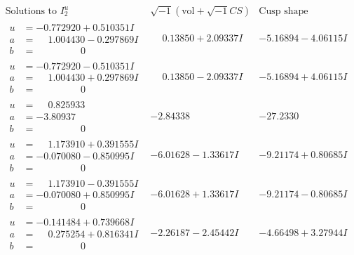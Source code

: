 \documentclass[1p]{elsarticle_modified}
\theoremstyle{definition}
\newcommand{\I}{\sqrt{-1}}
\begin{document}
$$\begin{array}{c|c|c}  
\text{Solutions to }I^u_{2}& \I (\text{vol} + \sqrt{-1}CS) & \text{Cusp shape}\\
 \hline 
\begin{aligned}
u &= -0.772920 + 0.510351 I \\
a &= \phantom{-}1.004430 - 0.297869 I \\
b &= \phantom{-0.000000 } 0\end{aligned}
 & \phantom{-}0.13850 + 2.09337 I & -5.16894 - 4.06115 I \\ \hline\begin{aligned}
u &= -0.772920 - 0.510351 I \\
a &= \phantom{-}1.004430 + 0.297869 I \\
b &= \phantom{-0.000000 } 0\end{aligned}
 & \phantom{-}0.13850 - 2.09337 I & -5.16894 + 4.06115 I \\ \hline\begin{aligned}
u &= \phantom{-}0.825933\phantom{ +0.000000I} \\
a &= -3.80937\phantom{ +0.000000I} \\
b &= \phantom{-0.000000 } 0\end{aligned}
 & -2.84338\phantom{ +0.000000I} & -27.2330\phantom{ +0.000000I} \\ \hline\begin{aligned}
u &= \phantom{-}1.173910 + 0.391555 I \\
a &= -0.070080 - 0.850995 I \\
b &= \phantom{-0.000000 } 0\end{aligned}
 & -6.01628 - 1.33617 I & -9.21174 + 0.80685 I \\ \hline\begin{aligned}
u &= \phantom{-}1.173910 - 0.391555 I \\
a &= -0.070080 + 0.850995 I \\
b &= \phantom{-0.000000 } 0\end{aligned}
 & -6.01628 + 1.33617 I & -9.21174 - 0.80685 I \\ \hline\begin{aligned}
u &= -0.141484 + 0.739668 I \\
a &= \phantom{-}0.275254 + 0.816341 I \\
b &= \phantom{-0.000000 } 0\end{aligned}
 & -2.26187 - 2.45442 I & -4.66498 + 3.27944 I \\ \hline\begin{aligned}

\end{aligned}
\end{array}$$
\end{document}
